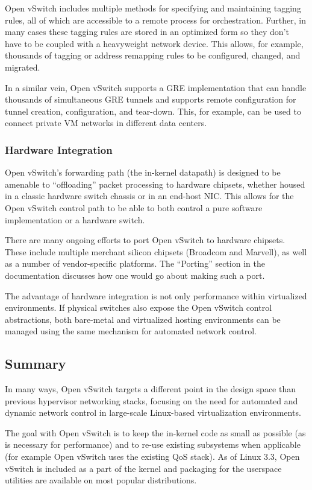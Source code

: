 \documentclass[../sn.tex]{subfiles}
\begin{document}
Open vSwitch includes multiple methods for specifying and maintaining tagging rules, all of which are 
accessible to a remote process for orchestration. Further, in many cases these tagging rules are stored in an 
optimized form so they don’t have to be coupled with a heavyweight network device. This allows, for example, 
thousands of tagging or address remapping rules to be configured, changed, and migrated.

In a similar vein, Open vSwitch supports a GRE implementation that can handle thousands of simultaneous 
GRE tunnels and supports remote configuration for tunnel creation, configuration, and tear-down. This, for example, 
can be used to connect private VM networks in different data centers.

\subsubsection{Hardware Integration}
Open vSwitch’s forwarding path (the in-kernel datapath) is designed to be amenable to “offloading” packet processing 
to hardware chipsets, whether housed in a classic hardware switch chassis or in an end-host NIC. This allows for the 
Open vSwitch control path to be able to both control a pure software implementation or a hardware switch.

There are many ongoing efforts to port Open vSwitch to hardware chipsets. These include multiple merchant silicon 
chipsets (Broadcom and Marvell), as well as a number of vendor-specific platforms. The “Porting” section in the 
documentation discusses how one would go about making such a port.

The advantage of hardware integration is not only performance within virtualized environments. If physical switches 
also expose the Open vSwitch control abstractions, both bare-metal and virtualized hosting environments can be managed 
using the same mechanism for automated network control.

\subsection{Summary}
In many ways, Open vSwitch targets a different point in the design space than previous hypervisor networking stacks, 
focusing on the need for automated and dynamic network control in large-scale Linux-based virtualization environments.

The goal with Open vSwitch is to keep the in-kernel code as small as possible (as is necessary for performance) and to 
re-use existing subsystems when applicable (for example Open vSwitch uses the existing QoS stack). As of Linux 3.3, Open 
vSwitch is included as a part of the kernel and packaging for the userspace utilities are available on most popular 
distributions.
\end{document}
